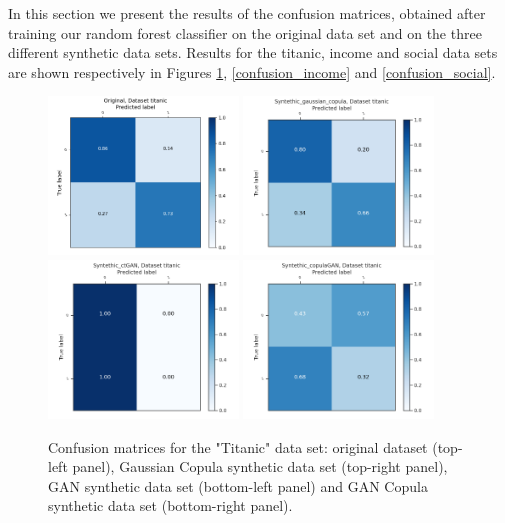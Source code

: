 \documentclass{article}
\begin{document}
In this section we present the results of the confusion matrices, obtained after training our random forest classifier on the original data set and on the three different synthetic data sets. Results for the titanic, income and social data sets are shown respectively in Figures \ref{confusion_titanic}, \ref{confusion_income} and \ref{confusion_social}.


\begin{figure}[h!]
	\centering
	\includegraphics[width=0.45\textwidth]{../ConfusionMatrixes/titanic_Original_.png}
	\includegraphics[width=0.45\textwidth]{../ConfusionMatrixes/titanic_Syntethic_gaussian_copula_.png}
	\includegraphics[width=0.45\textwidth]{../ConfusionMatrixes/titanic_Syntethic_ctGAN_.png}
	\includegraphics[width=0.45\textwidth]{../ConfusionMatrixes/titanic_Syntethic_copulaGAN_.png}

	\caption{Confusion matrices for the "Titanic" data set: original dataset (top-left panel), Gaussian Copula synthetic data set (top-right panel), GAN synthetic data set (bottom-left panel) and GAN Copula synthetic data set (bottom-right panel).  }
	\label{confusion_titanic}
\end{figure}
\end{document}
